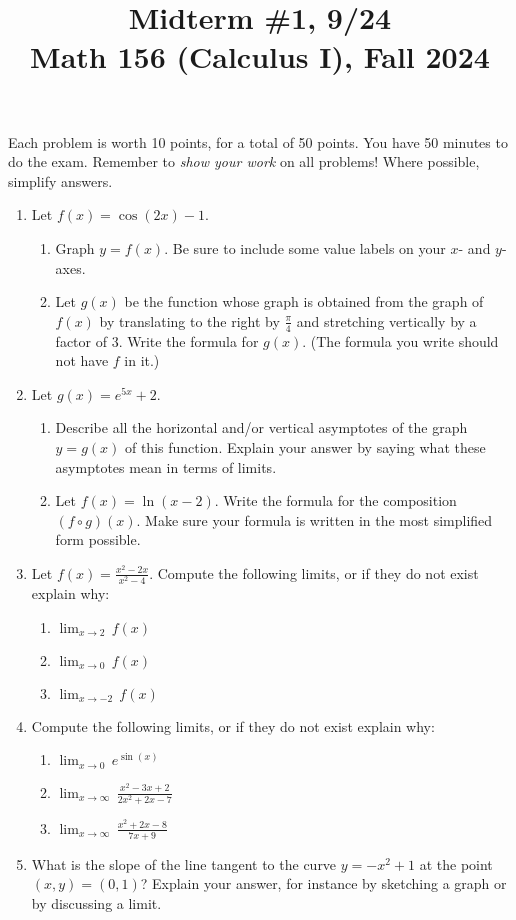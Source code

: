 \documentclass[11pt]{article}
\title{Midterm \#1, 9/24 \\ Math 156 (Calculus I), Fall 2024}
\date{}
\begin{document}
\maketitle

\thispagestyle{empty}

\vspace{-1cm}

Each problem is worth 10 points, for a total of 50 points. You have 50 minutes to do the exam. Remember to \emph{show your work} on all problems! Where possible, simplify answers.

\begin{enumerate}
\item Let $f(x) = \cos(2x)-1$.
\begin{enumerate}
\item Graph $y=f(x)$. Be sure to include some value labels on your $x$- and $y$-axes.
\item Let $g(x)$ be the function whose graph is obtained from the graph of $f(x)$ by translating to the right by $\frac{\pi}{4}$ and stretching vertically by a factor of $3$. Write the formula for $g(x)$. (The formula you write should not have $f$ in it.)
\end{enumerate}
\item Let $g(x)=e^{5x} + 2$. 
\begin{enumerate}
\item Describe all the horizontal and/or vertical asymptotes of the graph $y=g(x)$ of this function. Explain your answer by saying what these asymptotes mean in terms of limits.
\item Let $f(x) = \ln(x-2)$. Write the formula for the composition $(f\circ g)(x)$. Make sure your formula is written in the most simplified form possible.
\end{enumerate} 
\item Let $f(x) = \displaystyle \frac{x^2-2x}{x^2-4}$. Compute the following limits, or if they do not exist explain why:
\begin{enumerate}
\item $\displaystyle \lim_{x \to 2} \, f(x)$
\item $\displaystyle \lim_{x \to 0} \, f(x)$
\item $\displaystyle \lim_{x \to -2} \, f(x)$
\end{enumerate}
\item Compute the following limits, or if they do not exist explain why:
\begin{enumerate}
\item $\displaystyle \lim_{x \to 0} \, e^{\sin(x)}$
\item $\displaystyle \lim_{x \to \infty} \, \frac{x^2-3x+2}{2x^2+2x-7}$
\item $\displaystyle \lim_{x \to \infty} \, \frac{x^2+2x-8}{7x+9}$
\end{enumerate}
\item What is the slope of the line tangent to the curve $y=-x^2+1$ at the point $(x,y)=(0,1)$? Explain your answer, for instance by sketching a graph or by discussing a limit.
\end{enumerate}
\end{document}
